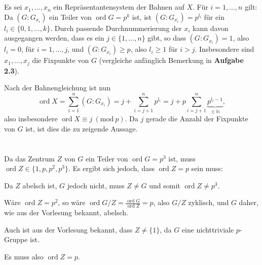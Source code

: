 \documentclass[a4paper,10pt]{article}
\theoremstyle{definition}
\newcommand{\N}{\mathbb{N}}
\newcommand{\ord}{\operatorname{ord}}
\begin{document}
\section{}

\subsection{}
Es sei $x_1, \ldots, x_n$ ein Repräsentantensystem der Bahnen auf $X$. Für $i=1,\ldots,n$ gilt: Da $(G : G_{x_i})$ ein Teiler von $\ord G = p^k$ ist, ist $(G : G_{x_i}) = p^{l_i}$ für ein $l_i \in \{0, 1, \ldots, k\}$. Durch passende Durchnummerierung der $x_i$ kann davon ausgegangen werden, dass es ein $j \in \{1,\ldots,n\}$ gibt, so dass $(G : G_{x_i}) = 1$, also $l_i = 0$, für $i=1,\ldots,j$, und $(G : G_{x_i}) \geq p$, also $l_i \geq 1$ für $i > j$. Insbesondere sind $x_1, \ldots, x_j$ die Fixpunkte von $G$ (vergleiche anfänglich Bemerkung in \textbf{Aufgabe 2.3}).

Nach der Bahnengleichung ist nun
\[
 \ord X
 = \sum_{i=1}^n (G : G_{x_i})
 = j + \sum_{i=j+1}^n p^{l_i}
 = j + p \sum_{i=j+1}^n \underbrace{p^{l_i - 1}}_{\in \N},
\]
also insbesondere $\ord X \equiv j\ (\textrm{mod}\ p)$. Da $j$ gerade die Anzahl der Fixpunkte von $G$ ist, ist dies die zu zeigende Aussage.






\section{}
Da das Zentrum $Z$ von $G$ ein Teiler von $\ord G = p^3$ ist, muss $\ord Z \in \{1, p, p^2, p^3\}$. Es ergibt sich jedoch, dass $\ord Z = p$ sein muss:

Da $Z$ abelsch ist, $G$ jedoch nicht, muss $Z \neq G$ und somit $\ord Z \neq p^3$.

Wäre $\ord Z = p^2$, so wäre $\ord G/Z = \frac{\ord G}{\ord Z} = p$, also $G/Z$ zyklisch, und $G$ daher, wie aus der Vorlesung bekannt, abelsch.

Auch ist aus der Vorlesung bekannt, dass $Z \neq \{1\}$, da $G$ eine nichttriviale $p$-Gruppe ist.

Es muss also $\ord Z = p$.
\end{document}
